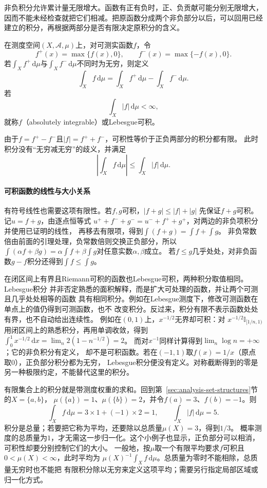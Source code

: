 非负积分允许累计量无限增大。函数有正有负时，正、负贡献可能分别无限增大，因而不能未经检查就把它们相减。把原函数分成两个非负部分以后，可以回用已经建立的积分，再根据两部分是否有限决定原积分的含义。
\begin{definition}[有符号积分与可积性]
\label{def:analysis-integrable-function}
在测度空间$(X,\mathcal{A},\mu)$上，对可测实函数$f$，令
\[   f^+(x)=\max\{f(x),0\},\qquad   f^-(x)=\max\{-f(x),0\}. \]
若$\int_X f^+\,\mathrm{d}\mu$与$\int_X f^-\,\mathrm{d}\mu$不同时为无穷，则定义
\[
  \int_X f\,\mathrm{d}\mu
  =\int_X f^+\,\mathrm{d}\mu-\int_X f^-\,\mathrm{d}\mu.
\]
若
\begin{equation}
  \int_X|f|\,\mathrm{d}\mu<\infty,
\label{eq:analysis-absolute-integrability}
\end{equation}
就称$f$（absolutely integrable）或Lebesgue可积。
\end{definition}
由于$f=f^+-f^-$且$|f|=f^++f^-$，可积性等价于正负两部分的积分都有限。
此时积分没有“无穷减无穷”的歧义，并满足
\[   \left|\int_X f\,\mathrm{d}\mu\right|   \leq   \int_X|f|\,\mathrm{d}\mu. \]

\paragraph{可积函数的线性与大小关系}
有符号线性也需要这项有限性。若$f,g$可积，$|f+g|\leq|f|+|g|$
先保证$f+g$可积。记$u=f+g$，由逐点恒等式
$u^++f^-+g^-=u^-+f^++g^+$，对两边的非负项积分并使用已证明的线性，
再移去有限项，得到$\int(f+g)=\int f+\int g$。
非负常数倍由前面的引理处理，负常数倍则交换正负部分，所以
$\int(\alpha f+\beta g)=\alpha\int f+\beta\int g$对任意实数$\alpha,\beta$成立。
若$f\leq g$几乎处处，对非负函数$g-f$积分还得到$\int f\leq\int g$。

在闭区间上有界且Riemann可积的函数也Lebesgue可积，两种积分取值相同。Lebesgue积分
并非否定熟悉的面积解释，而是扩大可处理的函数，并让两个可测且几乎处处相等的函数
具有相同积分。例如在Lebesgue测度下，修改可测函数在单点上的值仍得到可测函数，也不
改变积分。反过来，积分有限不表示函数处处有界，也不自动给出连续性。
例如在$(0,1)$上，$x^{-1/2}$无界却可积：对
$x^{-1/2}\mathbb I_{[1/n,1)}$用闭区间上的熟悉积分，再用单调收敛，得到
$\int_0^1x^{-1/2}\,\mathrm dx=\lim_n2(1-n^{-1/2})=2$。
而对$x^{-1}$同样计算得到$\lim_n\log n=+\infty$；它的非负积分有定义，
却不是可积函数。若在$(-1,1)$取$f(x)=1/x$（原点取$0$），正负部分积分都为无穷，
Lebesgue积分便没有定义。对称截断得到的零是另一种极限约定，不能替代这里的积分。

有限集合上的积分就是带测度权重的求和。回到第~\ref{sec:analysis-set-structures}节的$X=\{a,b\}$，
$\mu(\{a\})=1$、$\mu(\{b\})=2$，并令$f(a)=3$、$f(b)=-1$。则
\[
 \int_Xf\,\mathrm d\mu=3\times1+(-1)\times2=1,
 \qquad \int_X|f|\,\mathrm d\mu=5.
\]
积分是总量；若要把它称为平均，还要除以总质量$\mu(X)=3$，得到$1/3$。
概率测度的总质量为$1$，才无需这一步归一化。这个小例子也显示，正负部分可以相消，
可积性却要分别控制它们的大小。
一般地，按$\mu$取一个有限平均要求$f$可积且$0<\mu(X)<\infty$，此时平均为
$\mu(X)^{-1}\int_X f\,\mathrm d\mu$。总质量为零时不能相除，总质量无穷时也不能把
有限积分除以无穷来定义这项平均；需要另行指定局部区域或归一化方式。

